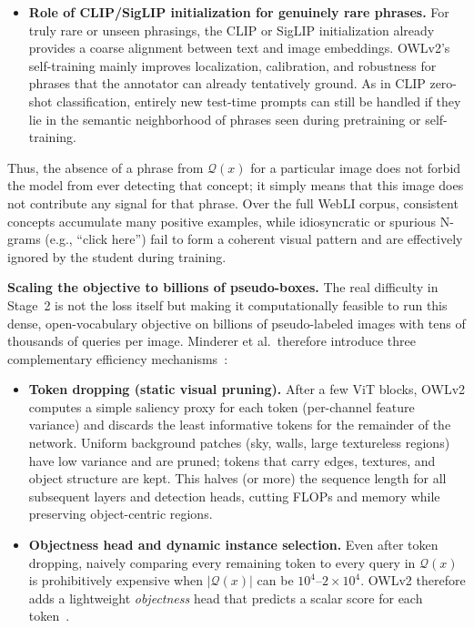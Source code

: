 \begin{enrichment}
\begin{enrichment}
\begin{enumerate}
\begin{itemize}
				\item \textbf{Role of CLIP/SigLIP initialization for genuinely rare phrases.}
				For truly rare or unseen phrasings, the CLIP or SigLIP initialization already provides a coarse alignment between text and image embeddings.
				OWLv2’s self-training mainly improves localization, calibration, and robustness for phrases that the annotator can already tentatively ground.
				As in CLIP zero-shot classification, entirely new test-time prompts can still be handled if they lie in the semantic neighborhood of phrases seen during pretraining or self-training.
			\end{itemize}
			
			Thus, the absence of a phrase from $\mathcal{Q}(x)$ for a particular image does not forbid the model from ever detecting that concept; it simply means that this image does not contribute any signal for that phrase.
			Over the full WebLI corpus, consistent concepts accumulate many positive examples, while idiosyncratic or spurious N-grams (e.g., ``click here'') fail to form a coherent visual pattern and are effectively ignored by the student during training.
			
			\medskip
			\noindent
			\textbf{Scaling the objective to billions of pseudo-boxes.}
			The real difficulty in Stage~2 is not the loss itself but making it computationally feasible to run this dense, open-vocabulary objective on billions of pseudo-labeled images with tens of thousands of queries per image.
			Minderer et al.\ therefore introduce three complementary efficiency mechanisms~\cite{minderer2024_owlvitv2}:
			
			\begin{itemize}
				\item \textbf{Token dropping (static visual pruning).}
				After a few ViT blocks, OWLv2 computes a simple saliency proxy for each token (per-channel feature variance) and discards the least informative tokens for the remainder of the network.
				Uniform background patches (sky, walls, large textureless regions) have low variance and are pruned; tokens that carry edges, textures, and object structure are kept.
				This halves (or more) the sequence length for all subsequent layers and detection heads, cutting FLOPs and memory while preserving object-centric regions.
				
				\item \textbf{Objectness head and dynamic instance selection.}
				Even after token dropping, naively comparing every remaining token to every query in $\mathcal{Q}(x)$ is prohibitively expensive when $|\mathcal{Q}(x)|$ can be $10^4$–$2\times 10^4$.
				OWLv2 therefore adds a lightweight \emph{objectness} head that predicts a scalar score for each token~\cite{minderer2024_owlvitv2}.
				

\end{itemize}
\end{enumerate}
\end{enrichment}
\end{enrichment}
